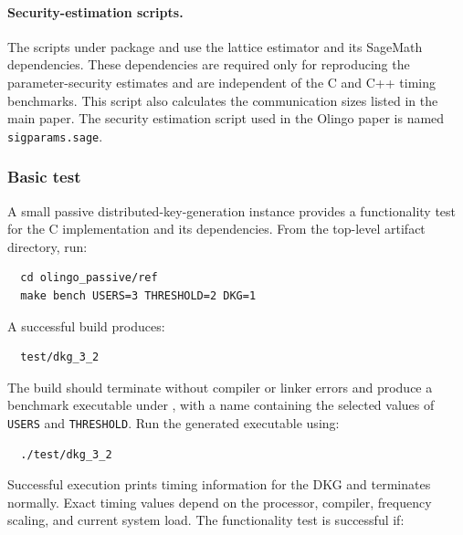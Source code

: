 \documentclass[nonacm,sigconf]{acmart}
\begin{document}
\paragraph{Security-estimation scripts.} The scripts under  package and use the lattice estimator and its SageMath dependencies. These dependencies are required only for reproducing the parameter-security estimates and are independent of the C and C++ timing benchmarks. This script also calculates the communication sizes listed in the main paper. The security estimation script used in the Olingo paper is named \texttt{sigparams.sage}.

\subsubsection{Basic test}



A small passive distributed-key-generation instance provides a functionality test for the C implementation and its dependencies. From the top-level artifact directory, run:

\begin{verbatim}
  cd olingo_passive/ref
  make bench USERS=3 THRESHOLD=2 DKG=1
\end{verbatim}

A successful build produces:
\begin{verbatim}
  test/dkg_3_2
\end{verbatim}

The build should terminate without compiler or linker errors and produce a benchmark executable under , with a name containing the selected values of \texttt{USERS} and \texttt{THRESHOLD}. Run the generated executable using:

\begin{verbatim}
  ./test/dkg_3_2
\end{verbatim}

Successful execution prints timing information for the DKG and terminates normally. Exact timing values depend on the processor, compiler, frequency scaling, and current system load. The functionality test is successful if:
\end{document}
